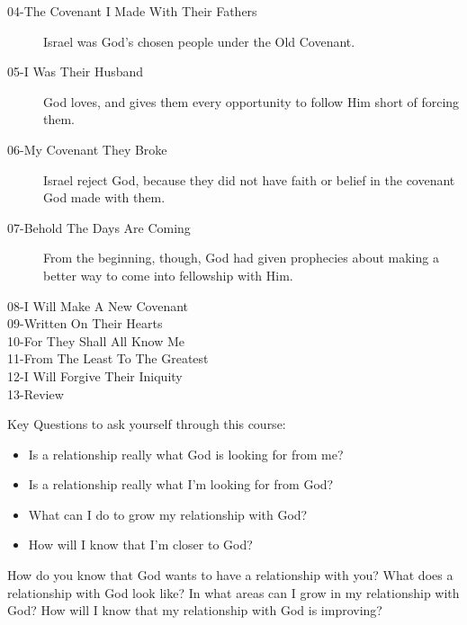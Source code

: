 \begin{discussion}
\begin{description}
\item[04-The Covenant I Made With Their Fathers] Israel was God's chosen people under the Old Covenant.

\item[05-I Was Their Husband] God loves, and gives them every opportunity to follow Him short of forcing them.

\item[06-My Covenant They Broke] Israel reject God, because they did not have faith or belief in the covenant God made with them.

\item[07-Behold The Days Are Coming] From the beginning, though, God had given prophecies about making a better way to come into fellowship with Him.

\item[08-I Will Make A New Covenant]  

\item[09-Written On Their Hearts]

\item[10-For They Shall All Know Me]

\item[11-From The Least To The Greatest]

\item[12-I Will Forgive Their Iniquity]

\item[13-Review]


\end{description}


Key Questions to ask yourself through this course:

\begin{itemize}
\item Is a relationship really what God is looking for from me?
\item Is a relationship really what I'm looking for from God?
\item What can I do to grow my relationship with God?
\item How will I know that I'm closer to God?
\end{itemize}


\end{discussion}

\begin{questions}
\q How do you know that God wants to have a relationship with you?
\q What does a relationship with God look like?
\q In what areas can I grow in my relationship with God?
\q How will I know that my relationship with God is improving?
\end{questions}